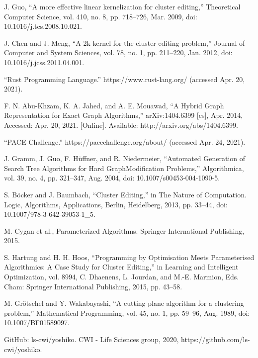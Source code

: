 \documentclass[12pt,oneside,english,parskip=full,headings=small]{scrbook}
\theoremstyle{definition}
\begin{document}
\begin{thebibliography}{99}
J. Guo, “A more effective linear kernelization for cluster editing,” Theoretical
Computer Science, vol. 410, no. 8, pp. 718–726, Mar. 2009, doi: 10.1016/j.tcs.2008.10.021.

J. Chen and J. Meng, “A 2k kernel for the cluster editing problem,” Journal of Computer and
System Sciences, vol. 78, no. 1, pp. 211–220, Jan. 2012, doi: 10.1016/j.jcss.2011.04.001.

“Rust Programming Language.” https://www.rust-lang.org/ (accessed Apr. 20, 2021).

F. N. Abu-Khzam, K. A. Jahed, and A. E. Mouawad, “A Hybrid Graph Representation for Exact Graph
Algorithms,” arXiv:1404.6399 [cs], Apr. 2014, Accessed: Apr. 20, 2021. [Online]. Available:
http://arxiv.org/abs/1404.6399.

“PACE Challenge.” https://pacechallenge.org/about/ (accessed Apr. 24, 2021).

J. Gramm, J. Guo, F. Hüffner, and R. Niedermeier, “Automated Generation of Search Tree Algorithms
for Hard GraphModification Problems,” Algorithmica, vol. 39, no. 4, pp. 321–347, Aug. 2004, doi:
10.1007/s00453-004-1090-5.

S. Böcker and J. Baumbach, “Cluster Editing,” in The Nature of Computation. Logic, Algorithms,
Applications, Berlin, Heidelberg, 2013, pp. 33–44, doi: 10.1007/978-3-642-39053-1\_5.

M. Cygan et al., Parameterized Algorithms. Springer International Publishing, 2015.

S. Hartung and H. H. Hoos, “Programming by Optimisation Meets Parameterised Algorithmics: A Case
Study for Cluster Editing,” in Learning and Intelligent Optimization, vol. 8994, C. Dhaenens, L.
Jourdan, and M.-E. Marmion, Eds. Cham: Springer International Publishing, 2015, pp. 43–58.

M. Grötschel and Y. Wakabayashi, “A cutting plane algorithm for a clustering problem,”
Mathematical Programming, vol. 45, no. 1, pp. 59–96, Aug. 1989, doi: 10.1007/BF01589097.

GitHub: ls-cwi/yoshiko. CWI - Life Sciences group, 2020, https://github.com/ls-cwi/yoshiko.

\end{thebibliography}
\end{document}

